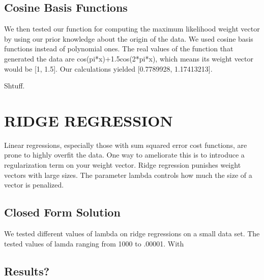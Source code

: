 \documentclass[a4paper,twoside]{article}
\begin{document}
\subsection{Cosine Basis Functions}

We then tested our function for computing the maximum likelihood weight vector by using our prior knowledge about the origin of the data. We used cosine basis functions instead of polynomial ones. The real values of the function that generated the data are cos(pi*x)+1.5cos(2*pi*x), which means its weight vector would be [1, 1.5]. Our calculations yielded [0.7789928, 1.17413213]. 

Shtuff.


\section{\uppercase{Ridge Regression}}

Linear regressions, especially those with sum squared error cost functions, are prone to highly overfit the data. One way to ameliorate this is to introduce a regularization term on your weight vector. Ridge regression punishes weight vectors with large sizes. The parameter lambda controls how much the size of a vector is penalized. 

\subsection{Closed Form Solution}

We tested different values of lambda on ridge regressions on a small data set. The tested values of lamda ranging from 1000 to .00001. With 

\subsection{Results?}

\end{document}
